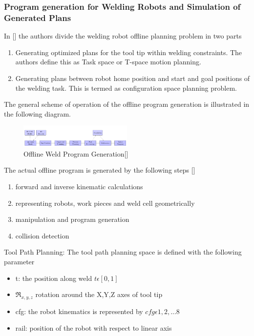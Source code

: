 \subsubsection{Program generation for Welding Robots and Simulation of Generated Plans}
In [\citet{Larkin2016}] the authors divide the welding robot offline planning problem in two parts
\begin{enumerate}
\item Generating optimized plans for the tool tip within welding constraints. The authors define this as Task space or T-space motion planning.
\item Generating plans between robot home position and start and goal positions of the welding task. This is termed as configuration space planning problem.
\end{enumerate}
The general scheme of operation of the offline program generation is illustrated in the following diagram.
\begin{figure}[htbp] %
 \centering
   \includegraphics[width=0.5\textwidth]{images/cadgen_model.png}
   \caption[Offline Weld Program Generation]
   {Offline Weld Program Generation[\citet{Larkin2016}]}  
\label{fig:img7}
\end{figure}
\newpage
The actual offline program is generated by the following steps [\citet{Larkin2016}]
\begin{enumerate}
\item forward and inverse kinematic calculations
\item representing robots, work pieces and weld cell geometrically
\item manipulation and program generation
\item collision detection
\end{enumerate}
Tool Path Planning: The tool path planning space is defined with the following parameter
\begin{itemize}
\item t: the position along weld $t \epsilon [0,1]$
\item $\Re_{x,y,z} $ rotation around the X,Y,Z axes of tool tip
\item cfg: the robot kinematics is represented by $cfg \epsilon {1,2,...8}$
\item rail: position of the robot with respect to linear axis 
\end{itemize}

